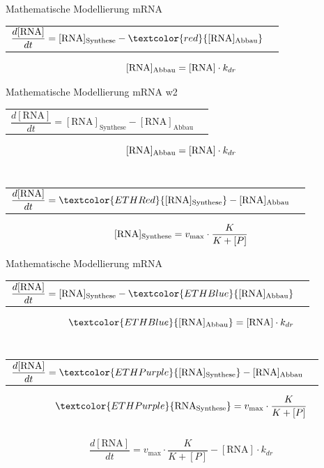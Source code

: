\documentclass[11pt,aspectratio=169,reqno]{beamer}
\begin{document}
\begin{frame}[t]{Mathematische Modellierung mRNA}
    \begin{tabular}{l l}
        $\dfrac{d[\text{RNA}]}{dt} =[\text{RNA}]_{\text{Synthese}}-\textcolor{red}{[\text{RNA}]_{\text{Abbau}}}$ &  \\
    \end{tabular}
    \begin{equation}\notag
        [\text{RNA}]_{\text{Abbau}}=[\text{RNA}] \cdot k_{dr}
    \end{equation}
\end{frame}

\begin{frame}[t]{Mathematische Modellierung mRNA}
w2    \begin{tabular}{l l}
        $\dfrac{d[\text{RNA}]}{dt} =[\text{RNA}]_{\text{Synthese}}-{[\text{RNA}]_{\text{Abbau}}}$ &  \\
    \end{tabular}
    \begin{equation}\notag
        [\text{RNA}]_{\text{Abbau}}=[\text{RNA}] \cdot k_{dr}
    \end{equation}
    \\[16pt]
    \begin{tabular}{l l}
        $\dfrac{d[\text{RNA}]}{dt} =\textcolor{ETHRed}{[\text{RNA}]_{\text{Synthese}}}-{[\text{RNA}]_{\text{Abbau}}}$ &  \\
    \end{tabular}
    \begin{equation}\notag
        [\text{RNA}]_{\text{Synthese}}=v_{\text{max}}\cdot\frac{K}{K+[P]}
    \end{equation}
\end{frame}

\begin{frame}[t]{Mathematische Modellierung mRNA}
    \begin{tabular}{l l}
        $\dfrac{d[\text{RNA}]}{dt} =[\text{RNA}]_{\text{Synthese}}-\textcolor{ETHBlue}{[\text{RNA}]_{\text{Abbau}}}$ &  \\
    \end{tabular}
    \begin{equation}\notag
        \textcolor{ETHBlue}{
        [\text{RNA}]_{\text{Abbau}}}=[\text{RNA}] \cdot k_{dr}
    \end{equation}
    \\[16pt]
    \begin{tabular}{l l}
        $\dfrac{d[\text{RNA}]}{dt} =\textcolor{ETHPurple}{[\text{RNA}]_{\text{Synthese}}}-[\text{RNA}]_{\text{Abbau}}$ &  \\
    \end{tabular}
    \begin{equation}\notag
    \textcolor{ETHPurple}{\text{RNA}_{\text{Synthese}}}=v_{\text{max}}\cdot\frac{K}{K+[P]}
    \end{equation}
    \\[16pt]
    \begin{equation}\tag{1}
        \frac{d[\text{RNA}]}{dt}=v_{\text{max}}\cdot\frac{K}{K+[P]}-[\text{RNA}] \cdot k_{dr}
    \end{equation}
\end{frame}
\end{document}
